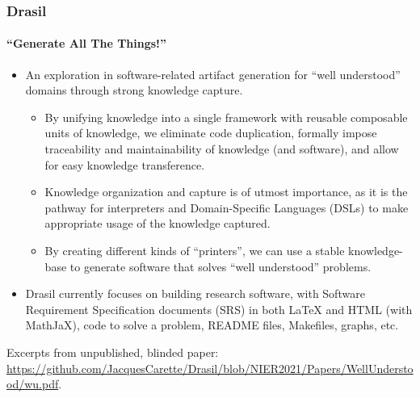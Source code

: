 \documentclass{beamer}
\begin{document}
\begin{frame}
\end{frame}

\begin{frame}
    \frametitle{Drasil}
    \framesubtitle{``Generate All The Things!''}
    
    \begin{itemize}
        \item<2-> An exploration in software-related artifact generation for ``well understood'' domains through strong knowledge capture.
            \begin{itemize}
                \item<3-> By unifying knowledge into a single framework with reusable composable units of knowledge, we eliminate code duplication, formally impose traceability and maintainability of knowledge (and software), and allow for easy knowledge transference.
                \item<4-> Knowledge organization and capture is of utmost importance, as it is the pathway for interpreters and Domain-Specific Languages (DSLs) to make appropriate usage of the knowledge captured.
                \item<5-> By creating different kinds of ``printers'', we can use a stable knowledge-base to generate software that solves ``well understood'' problems.
            \end{itemize}
        \item<6-> Drasil currently focuses on building research software, with Software Requirement Specification documents (SRS) in both LaTeX and HTML (with MathJaX), code to solve a problem, README files, Makefiles, graphs, etc.
    \end{itemize}

    \tiny{} Excerpts from unpublished, blinded paper: \url{https://github.com/JacquesCarette/Drasil/blob/NIER2021/Papers/WellUnderstood/wu.pdf}.
\end{frame}
\end{document}
